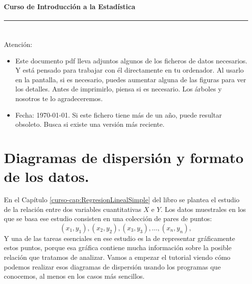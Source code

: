 \documentclass[10pt,a4paper]{article}\usepackage[]{graphicx}\usepackage[]{color}
\newcounter {cont01}
\begin{document}


\paragraph{\hspace{6.3cm}Curso de Introducción a la Estadística\\[2mm]} \noindent\hrule

\setcounter{section}{0}
\section*{\hspace{-0.1cm}} Atención:
\begin{itemize}
  \item Este documento pdf lleva adjuntos algunos de los ficheros de datos necesarios. Y está
      pensado para trabajar con él directamente en tu ordenador. Al usarlo en la pantalla, si es
      necesario, puedes aumentar alguna de las figuras para ver los detalles. Antes de
      imprimirlo, piensa si es necesario. Los árboles y nosotros te lo agradeceremos.
  \item Fecha: \today. Si este fichero tiene más de un año, puede resultar obsoleto. Busca si
      existe una versión más reciente.
\end{itemize}
\setcounter{tocdepth}{1}
\tableofcontents

\section{Diagramas de dispersión y formato de los datos.}

En el Capítulo \ref{curso-cap:RegresionLinealSimple} del libro se plantea el estudio de la relación  entre dos variables cuantitativas $X$ e $Y$. Los datos muestrales en los que se basa ese estudio consisten en una colección de pares de puntos:
\[(x_1,y_1),(x_2,y_2),(x_3,y_3),\ldots,(x_n,y_n),\]
Y una de las tareas esenciales en ese estudio es la de representar gráficamente estos puntos, porque esa gráfica contiene mucha información sobre la posible relación que tratamos de analizar. Vamos a empezar el tutorial viendo cómo podemos realizar esos {\sf diagramas de dispersión} usando los programas que conocemos, al menos en los casos más sencillos.
\end{document}
